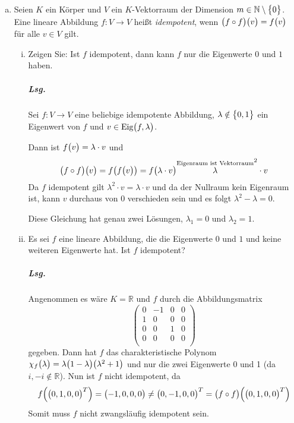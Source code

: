 \documentclass{scrreprt}
\begin{document}
\begin{enumerate}[(a)]
\item Seien $K$ ein Körper und $V$ ein $K$-Vektorraum der Dimension
  $m \in \mathbb{N} \setminus \qty\big{0}$.
  Eine lineare Abbildung $f \colon V \to V$ heißt \emph{idempotent},
  wenn $\qty\big(f \circ f)\qty\big(v) = f\qty\big(v)$ für alle $v \in V$ gilt.
  \begin{enumerate}[(i)]
  \item Zeigen Sie: Ist $f$ idempotent, dann kann $f$ nur die Eigenwerte $0$ und
    $1$ haben.

    \subparagraph{Lsg.} Sei $f \colon V \to V$ eine beliebige idempotente
    Abbildung, $\lambda \notin \qty\big{0, 1}$ ein Eigenwert von $f$ und
    $v \in \text{Eig}\qty\big(f, \lambda)$.

    Dann ist $f\qty\big(v) = \lambda \cdot v$ und
    \[
      \qty\big(f \circ f)\qty\big(v) = f\qty(f\qty\big(v)) = f\qty\big(\lambda \cdot v)
      \overset{\text{Eigenraum ist Vektorraum}} \lambda^2 \cdot v
    \]
    Da $f$ idempotent gilt $\lambda^2 \cdot v = \lambda \cdot v$ und da der
    Nullraum kein Eigenraum ist, kann $v$ durchaus von 0 verschieden sein und es
    folgt $\lambda^2 - \lambda = 0$.

    Diese Gleichung hat genau zwei Lösungen, $\lambda_1 = 0$ und $\lambda_2 = 1$.

  \newpage
  \item Es sei $f$ eine lineare Abbildung, die die Eigenwerte $0$ und $1$ und
    keine weiteren Eigenwerte hat.
    Ist $f$ idempotent?

    \subparagraph{Lsg.}
    Angenommen es wäre $K = \mathbb{R}$ und $f$ durch die Abbildungsmatrix
    \[
      \begin{pmatrix}
        0 & -1 & 0 & 0 \\
        1 & 0  & 0 & 0 \\
        0 & 0  & 1 & 0 \\
        0 & 0  & 0 & 0 \\
      \end{pmatrix}
    \]
    gegeben.
    Dann hat $f$ das charakteristische Polynom
    $\chi_f\qty\big(\lambda) = \lambda\qty\big(1 - \lambda)\qty\big(\lambda^2 + 1)$
    und nur die zwei Eigenwerte 0 und 1 (da $i, -i \notin \mathbb{R}$).
    Nun ist $f$ nicht idempotent, da
    \[
      f\qty(\qty\big(0, 1, 0, 0)^T) = \qty\big(-1, 0, 0, 0) \ne
      \qty\big(0, -1, 0, 0)^T = \qty\big(f \circ f)\qty(\qty\big(0, 1, 0, 0)^T)
    \]
    Somit muss $f$ nicht zwangsläufig idempotent sein.
  \end{enumerate}
\end{enumerate}
\end{document}
